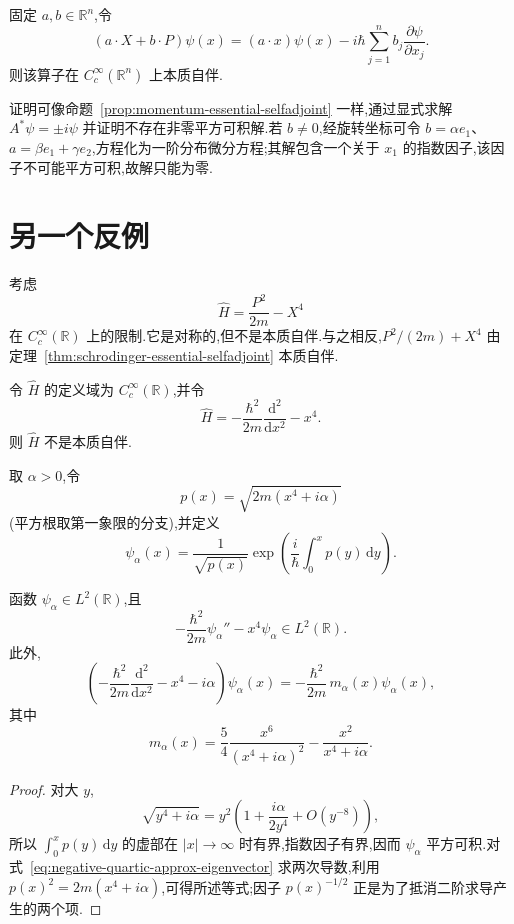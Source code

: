 \begin{proposition}[线性位置动量组合]\label{prop:linear-position-momentum-essential}
固定 \(a,b\in\mathbb{R}^{n}\),令
\[
(a\cdot X+b\cdot P)\psi(x)
=(a\cdot x)\psi(x)-i\hbar\sum_{j=1}^{n}b_{j}\frac{\partial\psi}{\partial x_{j}}.
\]
则该算子在 \(C_{c}^{\infty}(\mathbb{R}^{n})\) 上本质自伴.
\end{proposition}

证明可像命题~\ref{prop:momentum-essential-selfadjoint} 一样,通过显式求解 \(A^{*}\psi=\pm i\psi\) 并证明不存在非零平方可积解.若 \(b\neq0\),经旋转坐标可令 \(b=\alpha e_{1}\)、\(a=\beta e_{1}+\gamma e_{2}\),方程化为一阶分布微分方程;其解包含一个关于 \(x_{1}\) 的指数因子,该因子不可能平方可积,故解只能为零.

\section{另一个反例}
\label{sec:second-counterexample}

考虑
\[
\widehat H=\frac{P^{2}}{2m}-X^{4}
\]
在 \(C_{c}^{\infty}(\mathbb{R})\) 上的限制.它是对称的,但不是本质自伴.与之相反,\(P^{2}/(2m)+X^{4}\) 由定理~\ref{thm:schrodinger-essential-selfadjoint} 本质自伴.

\begin{theorem}[负四次势的反例]\label{thm:negative-quartic-counterexample}
令 \(\widehat H\) 的定义域为 \(C_{c}^{\infty}(\mathbb{R})\),并令
\[
\widehat H=-\frac{\hbar^{2}}{2m}\frac{\mathrm{d}^{2}}{\mathrm{d}x^{2}}-x^{4}.
\]
则 \(\widehat H\) 不是本质自伴.
\end{theorem}

取 \(\alpha>0\),令
\[
p(x)=\sqrt{2m(x^{4}+i\alpha)}
\]
(平方根取第一象限的分支),并定义
\[
\psi_{\alpha}(x)=\frac{1}{\sqrt{p(x)}}
\exp\left(\frac{i}{\hbar}\int_{0}^{x}p(y)\,\mathrm{d}y\right).
\label{eq:negative-quartic-approx-eigenvector}
\]

\begin{lemma}[负四次势的近似特征向量]\label{lem:negative-quartic-approx}
函数 \(\psi_{\alpha}\in L^{2}(\mathbb{R})\),且
\[
-\frac{\hbar^{2}}{2m}\psi_{\alpha}''-x^{4}\psi_{\alpha}\in L^{2}(\mathbb{R}).
\]
此外,
\[
\left(-\frac{\hbar^{2}}{2m}\frac{\mathrm{d}^{2}}{\mathrm{d}x^{2}}-x^{4}-i\alpha\right)\psi_{\alpha}(x)
=-\frac{\hbar^{2}}{2m}\,m_{\alpha}(x)\psi_{\alpha}(x),
\]
其中
\[
m_{\alpha}(x)=\frac{5}{4}\frac{x^{6}}{(x^{4}+i\alpha)^{2}}-\frac{x^{2}}{x^{4}+i\alpha}.
\]
\end{lemma}

\begin{proof}
对大 \(y\),
\[
\sqrt{y^{4}+i\alpha}=y^{2}\left(1+\frac{i\alpha}{2y^{4}}+O(y^{-8})\right),
\]
所以 \(\int_{0}^{x}p(y)\,\mathrm{d}y\) 的虚部在 \(|x|\to\infty\) 时有界,指数因子有界,因而 \(\psi_{\alpha}\) 平方可积.对式~\eqref{eq:negative-quartic-approx-eigenvector} 求两次导数,利用 \(p(x)^{2}=2m(x^{4}+i\alpha)\),可得所述等式;因子 \(p(x)^{-1/2}\) 正是为了抵消二阶求导产生的两个项.
\end{proof}

